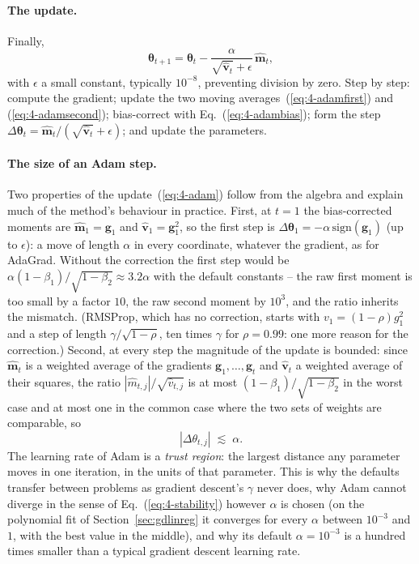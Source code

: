 \paragraph{The update.}
Finally,
\begin{equation}
  \boxed{\;
  \bm{\theta}_{t+1} = \bm{\theta}_t
    - \frac{\alpha}{\sqrt{\hat{\bm{v}}_t}+\epsilon}\,\hat{\bm{m}}_t , \;}
  \label{eq:4-adam}
\end{equation}
with $\epsilon$ a small constant, typically $10^{-8}$, preventing division by
zero.  Step by step: compute the gradient; update the two moving
averages~(\ref{eq:4-adamfirst}) and (\ref{eq:4-adamsecond}); bias-correct with
Eq.~(\ref{eq:4-adambias}); form the step
$\Delta\bm{\theta}_t=\hat{\bm{m}}_t/(\sqrt{\hat{\bm{v}}_t}+\epsilon)$; and
update the parameters.

\paragraph{The size of an Adam step.}
Two properties of the update~(\ref{eq:4-adam}) follow from the algebra and
explain much of the method's behaviour in practice.  First, at $t=1$ the
bias-corrected moments are $\hat{\bm{m}}_1=\bm{g}_1$ and
$\hat{\bm{v}}_1=\bm{g}_1^{2}$, so the first step is
$\Delta\bm{\theta}_1=-\alpha\,\mathrm{sign}(\bm{g}_1)$ (up to $\epsilon$): a
move of length $\alpha$ in every coordinate, whatever the gradient, as for
AdaGrad.  Without the correction the first step would be
$\alpha(1-\beta_1)/\sqrt{1-\beta_2}\approx3.2\alpha$ with the default
constants -- the raw first moment is too small by a factor $10$, the raw
second moment by $10^{3}$, and the ratio inherits the mismatch.  (RMSProp,
which has no correction, starts with $v_1=(1-\rho)g_1^{2}$ and a step of
length $\gamma/\sqrt{1-\rho}$, ten times $\gamma$ for $\rho=0.99$: one more
reason for the correction.)  Second, at
every step the magnitude of the update is bounded: since $\hat{\bm{m}}_t$ is
a weighted average of the gradients $\bm{g}_1,\dots,\bm{g}_t$ and
$\hat{\bm{v}}_t$ a weighted average of their squares, the ratio
$|\hat m_{t,j}|/\sqrt{\hat v_{t,j}}$ is at most $(1-\beta_1)/\sqrt{1-\beta_2}$
in the worst case and at most one in the common case where the two sets of
weights are comparable, so
\begin{equation}
  |\Delta\theta_{t,j}|\;\lesssim\;\alpha .
  \label{eq:4-adambound}
\end{equation}
The learning rate of Adam is a \emph{trust region}: the largest distance any
parameter moves in one iteration, in the units of that parameter.  This is
why the defaults transfer between problems as gradient descent's $\gamma$
never does, why Adam cannot diverge in the sense of Eq.~(\ref{eq:4-stability})
however $\alpha$ is chosen (on the polynomial fit of
Section~\ref{sec:gdlinreg} it converges for every $\alpha$ between $10^{-3}$
and $1$, with the best value in the middle), and why its default
$\alpha=10^{-3}$ is a hundred times smaller than a typical gradient descent
learning rate.

